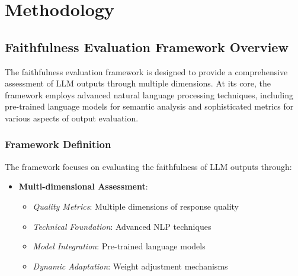 \section{Methodology}\label{sec:methodology}

\subsection{Faithfulness Evaluation Framework Overview}
The faithfulness evaluation framework is designed to provide a comprehensive assessment of LLM outputs through multiple dimensions. At its core, the framework employs advanced natural language processing techniques, including pre-trained language models for semantic analysis and sophisticated metrics for various aspects of output evaluation.

\vspace{0.5em}
\subsubsection{Framework Definition}
The framework focuses on evaluating the faithfulness of LLM outputs through:
\begin{itemize}
    \item \textbf{Multi-dimensional Assessment}:
    \begin{itemize}
        \item \textit{Quality Metrics}: Multiple dimensions of response quality
        \item \textit{Technical Foundation}: Advanced NLP techniques
        \item \textit{Model Integration}: Pre-trained language models
        \item \textit{Dynamic Adaptation}: Weight adjustment mechanisms
    \end{itemize}
\end{itemize}

\vspace{0.5em}
